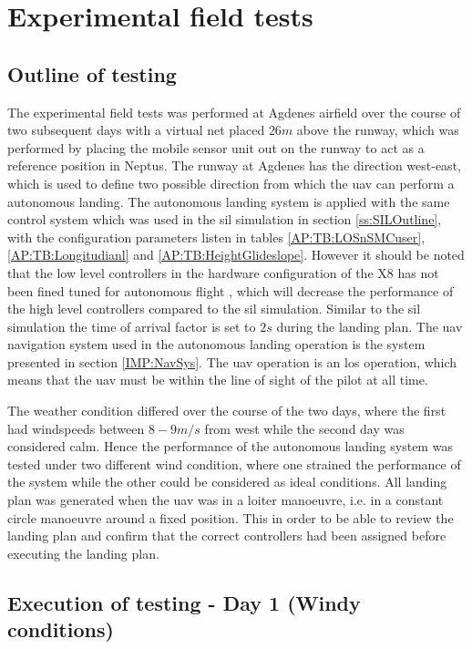 \chapter{Experimental field tests}\label{Ch:ExperimentalTesting}
\section{Outline of testing}
The experimental field tests was performed at Agdenes airfield over the course of two subsequent days with a virtual net placed $26 m$ above the runway, which was performed by placing the mobile sensor unit out on the runway to act as a reference position in Neptus. The runway at Agdenes has the direction west-east, which is used to define two possible direction from which the \gls{uav} can perform a autonomous landing. The autonomous landing system is applied with the same control system which was used in the \gls{sil} simulation in section \ref{ss:SILOutline}, with the configuration parameters listen in tables \ref{AP:TB:LOSnSMCuser}, \ref{AP:TB:Longitudianl} and \ref{AP:TB:HeightGlideslope}. However it should be noted that the low level controllers in the hardware configuration of the X8 has not been fined tuned for autonomous flight \citep{Sigurd}, which will decrease the performance of the high level controllers compared to the \gls{sil} simulation. Similar to the \gls{sil} simulation the time of arrival factor is set to $2 s$ during the landing plan. The \gls{uav} navigation system used in the autonomous landing operation is the system presented in section \ref{IMP:NavSys}. The \gls{uav} operation is an \gls{los} operation, which means that the \gls{uav} must be within the line of sight of the pilot at all time.

The weather condition differed over the course of the two days, where the first had windspeeds between $8-9 m/s$ from west while the second day was considered calm. Hence the performance of the autonomous landing system was tested under two different wind condition, where one strained the performance of the system while the other could be considered as ideal conditions. All landing plan was generated when the \gls{uav} was in a loiter manoeuvre, i.e. in a constant circle manoeuvre around a fixed position. This in order to be able to review the landing plan and confirm that the correct controllers had been assigned before executing the landing plan.
\section{Execution of testing - Day 1 (Windy conditions)}
